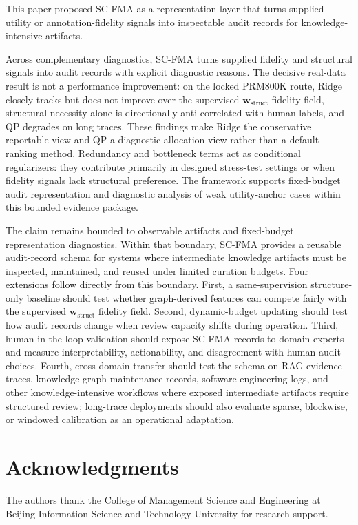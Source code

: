 \documentclass[a4paper,fleqn]{cas-sc}
\newcommand{\wstruct}{\ensuremath{\mathbf{w}_{\mathrm{struct}}}}
\begin{document}
This paper proposed SC-FMA as a representation layer that turns supplied utility or annotation-fidelity signals into inspectable audit records for knowledge-intensive artifacts.

Across complementary diagnostics, SC-FMA turns supplied fidelity and structural signals into audit records with explicit diagnostic reasons. The decisive real-data result is not a performance improvement: on the locked PRM800K route, Ridge closely tracks but does not improve over the supervised \wstruct{} fidelity field, structural necessity alone is directionally anti-correlated with human labels, and QP degrades on long traces. These findings make Ridge the conservative reportable view and QP a diagnostic allocation view rather than a default ranking method. Redundancy and bottleneck terms act as conditional regularizers: they contribute primarily in designed stress-test settings or when fidelity signals lack structural preference. The framework supports fixed-budget audit representation and diagnostic analysis of weak utility-anchor cases within this bounded evidence package.

The claim remains bounded to observable artifacts and fixed-budget representation diagnostics. Within that boundary, SC-FMA provides a reusable audit-record schema for systems where intermediate knowledge artifacts must be inspected, maintained, and reused under limited curation budgets. Four extensions follow directly from this boundary. First, a same-supervision structure-only baseline should test whether graph-derived features can compete fairly with the supervised \wstruct{} fidelity field. Second, dynamic-budget updating should test how audit records change when review capacity shifts during operation. Third, human-in-the-loop validation should expose SC-FMA records to domain experts and measure interpretability, actionability, and disagreement with human audit choices. Fourth, cross-domain transfer should test the schema on RAG evidence traces, knowledge-graph maintenance records, software-engineering logs, and other knowledge-intensive workflows where exposed intermediate artifacts require structured review; long-trace deployments should also evaluate sparse, blockwise, or windowed calibration as an operational adaptation.

\section*{Acknowledgments}
The authors thank the College of Management Science and Engineering at Beijing Information Science and Technology University for research support.
\end{document}
